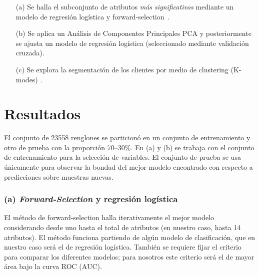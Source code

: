 \documentclass[letterpaper,11pt]{article}
\begin{document}
\begin{multicols}{2}
\begin{itemize}
    \item[(a)] Se halla el subconjunto de atributos \emph{más significativos} mediante un modelo de regresión logística
        y forward-selection~\cite[Cap. 6]{book1}.
    \item[(b)] Se aplica un Análisis de Componentes Principales PCA \cite{book2} y posteriormente se ajusta un modelo de regresión
        logística (seleccionado mediante validación cruzada). 
    \item[(c)] Se explora la segmentación de los clientes por medio de clustering (K-modes) \cite{kmodes}.
\end{itemize}

\section{Resultados}
El conjunto de 23558 renglones se particionó en un conjunto de entrenamiento y otro de prueba con la
proporción 70--30\%. En (a) y (b) se trabaja con el conjunto de entrenamiento para la selección de variables. El
conjunto de prueba se usa únicamente para observar la bondad del mejor modelo encontrado con respecto a predicciones
sobre muestras nuevas. 
\subsubsection*{(a) \emph{Forward-Selection} y regresión logística}
El método de forward-selection\cite{book1} halla iterativamente el mejor modelo considerando desde uno hasta el total de atributos
(en nuestro caso, hasta 14 atributos). El método funciona partiendo de algún
modelo de clasificación, que en nuestro caso será el de regresión logística. También se requiere fijar el criterio
para comparar los diferentes modelos; para nosotros este criterio será el de mayor área bajo la curva ROC (AUC). 


\end{multicols}
\end{document}
